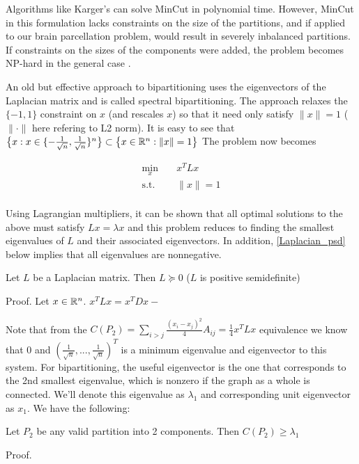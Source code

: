 Algorithms like Karger's can solve MinCut in polynomial time. However,
MinCut in this formulation lacks constraints on the size of the
partitions, and if applied to our brain parcellation problem, would
result in severely inbalanced partitions. If constraints on the sizes
of the components were added, the problem becomes NP-hard in the
general case \cite{Buluc:13}.

An old but effective approach to bipartitioning uses the eigenvectors
of the Laplacian matrix and is called spectral bipartitioning.
The approach relaxes the $\{-1, 1\}$ constraint on $x$ (and rescales
$x$) so that it need only satisfy $\|x\| = 1$ ($\|\cdot\|$ here refering
to L2 norm). It is easy to see that
$\big\{ x : x \in \{-\frac{1}{\sqrt{n}}, \frac{1}{\sqrt{n}}\}^n \big\}
 \subset \big\{ x \in \mathbb{R}^n : \|x\| = 1 \big\}$
The problem now becomes

\begin{equation} \label{spectral_bipartition}
\begin{aligned}
\min_x      &\;& x^T L x \\
\text{s.t.} &\;& \| x \| = 1 \\
\end{aligned}
\end{equation}

Using Lagrangian multipliers, it can be shown that all optimal solutions
to the above must satisfy $L x = \lambda x$ and this problem reduces to
finding the smallest eigenvalues of $L$ and their associated
eigenvectors. In addition, \ref{Laplacian_psd} below implies that all
eigenvalues are nonnegative.

\begin{theorem} \label{Laplacian_psd}
Let $L$ be a Laplacian matrix. Then $L \succeq 0$
($L$ is positive semidefinite)

Proof. Let $x \in \mathbb{R}^n$. $x^T L x = x^T D x - $
\end{theorem}

Note that from the
$C(P_2) = \sum_{i > j} \frac{(x_i - x_j)^2}{4} A_{ij}
        = \frac{1}{4} x^T L x$ equivalence we know that
$0$ and $(\frac{1}{\sqrt{n}}, ..., \frac{1}{\sqrt{n}})^T$ is a minimum
eigenvalue and eigenvector to this system. For bipartitioning, the
useful eigenvector is the one that corresponds to the 2nd smallest
eigenvalue, which is nonzero if the graph as a whole is connected.
We'll denote this eigenvalue as $\lambda_1$ and corresponding unit
eigenvector as $x_1$. We have the following:

\begin{theorem}
Let $P_2$ be any valid partition into 2 components. Then
$C(P_2) \geq \lambda_1$

Proof.
\end{theorem}


